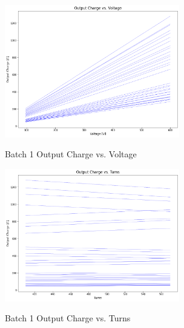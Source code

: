 \begin{figure}
    \begin{center}
    \includegraphics[width=3in]{fig13.png}
    \end{center}
    \renewcommand{\baselinestretch}{1}
    \small\normalsize
    \begin{quote}
    \caption[Batch 1 Output Charge vs. Voltage]{Batch 1 Output Charge vs. Voltage} \label{fig: f13}
    \end{quote}
\end{figure}

\begin{figure}
    \begin{center}
    \includegraphics[width=3in]{fig14.png}
    \end{center}
    \renewcommand{\baselinestretch}{1}
    \small\normalsize
    \begin{quote}
    \caption[Batch 1 Output Charge vs. Turns]{Batch 1 Output Charge vs. Turns} \label{fig: f14}
    \end{quote}
\end{figure}

